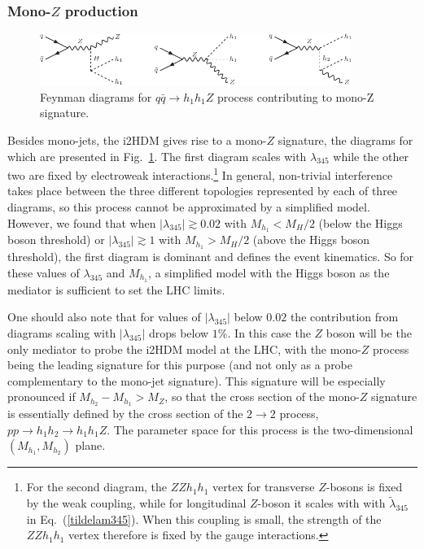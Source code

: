\documentclass[12pt,a4paper]{article}
\begin{document}
\subsubsection{Mono-$Z$ production}

%
\begin{figure}[h!]
\begin{center}
\includegraphics[width=0.9\textwidth]{fd-mono-z.pdf} 
\caption{Feynman diagrams for $q\bar{q}\to h_1 h_1Z$  process 
contributing to mono-Z signature.}
\label{fig:fd-mono-Z}
\end{center}
\end{figure}
%

Besides mono-jets, the i2HDM gives rise to a mono-$Z$ signature, the 
diagrams for which are presented in Fig.~\ref{fig:fd-mono-Z}.
The first diagram scales with $\lambda_{345}$ while the other two are fixed by electroweak interactions.\footnote{For the second diagram, the $ZZh_1h_1$ vertex for transverse $Z$-bosons is fixed by the weak coupling,
while for longitudinal $Z$-boson it scales with with $\tilde\lambda_{345}$ in Eq.~(\ref{tildelam345}). 
When this coupling is small, the strength of the  $ZZh_1h_1$ vertex therefore
is fixed by the gauge interactions.}
In general, non-trivial interference takes place between the three different topologies represented by each of three 
diagrams, so  this process cannot be approximated by a simplified model.
However, we found that when $|\lambda_{345}|\gtrsim 0.02$ with $M_{h_1}< M_H/2$ (below the Higgs boson threshold)
or $|\lambda_{345}|\gtrsim 1$ with $M_{h_1}> M_H/2$ (above the Higgs boson threshold),
the first diagram is dominant and defines the event kinematics. 
So for these values of $\lambda_{345}$ and $M_{h_1}$, a simplified
model with the Higgs boson as the mediator is sufficient to set the LHC limits.

One should also note that for values of $|\lambda_{345}|$
below $0.02$ the contribution from diagrams scaling with $|\lambda_{345}|$
drops below $1\%$. In this case the
$Z$ boson will be the only mediator to probe the i2HDM model at the LHC,
with the mono-$Z$ process being the leading signature
for this purpose (and not only as a probe complementary to the mono-jet signature). 
This signature will be especially pronounced if $M_{h_2}-M_{h_1} > M_Z$,
so that the cross section of the mono-$Z$ signature
is essentially defined by the cross section of the $2 \to 2$ process,
$pp\to h_1 h_2 \to h_1 h_1 Z$.
The parameter space for this process is
the two-dimensional $(M_{h_1},M_{h_2})$ plane.
\end{document}
